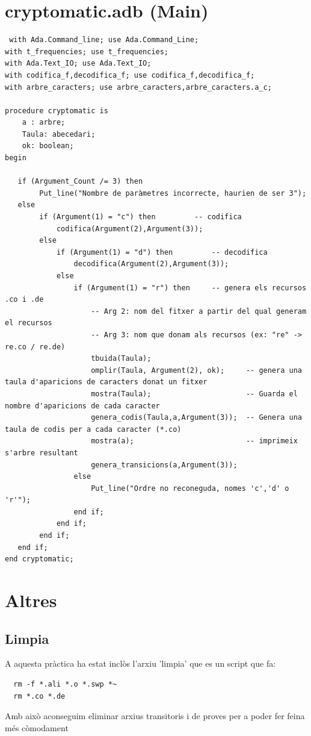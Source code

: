 \documentclass[a4paper,12pt]{article}
\begin{document}
\section{cryptomatic.adb (Main)}
\begin{lstlisting}
 with Ada.Command_line; use Ada.Command_Line;
with t_frequencies; use t_frequencies;
with Ada.Text_IO; use Ada.Text_IO;
with codifica_f,decodifica_f; use codifica_f,decodifica_f;
with arbre_caracters; use arbre_caracters,arbre_caracters.a_c;
 
procedure cryptomatic is
	a : arbre;
	Taula: abecedari;
	ok: boolean;
begin   
   
   if (Argument_Count /= 3) then 
		Put_line("Nombre de paràmetres incorrecte, haurien de ser 3");
   else		
		if (Argument(1) = "c") then			-- codifica			
			codifica(Argument(2),Argument(3));	
		else 
			if (Argument(1) = "d") then 		-- decodifica
				decodifica(Argument(2),Argument(3));
			else 
				if (Argument(1) = "r") then		-- genera els recursos .co i .de
					-- Arg 2: nom del fitxer a partir del qual generam el recursos
					-- Arg 3: nom que donam als recursos (ex: "re" -> re.co / re.de)
					tbuida(Taula);      
					omplir(Taula, Argument(2), ok);		-- genera una taula d'aparicions de caracters donat un fitxer
					mostra(Taula); 						-- Guarda el nombre d'aparicions de cada caracter
					genera_codis(Taula,a,Argument(3));	-- Genera una taula de codis per a cada caracter (*.co)
					mostra(a);							-- imprimeix s'arbre resultant	
					genera_transicions(a,Argument(3));
				else
					Put_line("Ordre no reconeguda, nomes 'c','d' o 'r'");
				end if;
			end if;
		end if;
   end if;
end cryptomatic;

\end{lstlisting}
\pagebreak

\section{Altres}

\subsection{Limpia}
A aquesta pràctica ha estat inclòs l'arxiu 'limpia' que es un script que fa:
\begin{center}
  \begin{lstlisting}
  rm -f *.ali *.o *.swp *~
  rm *.co *.de
  \end{lstlisting}
\end{center}
Amb això aconseguim eliminar arxius transitoris i de proves per a poder fer feina més còmodament
\end{document}
